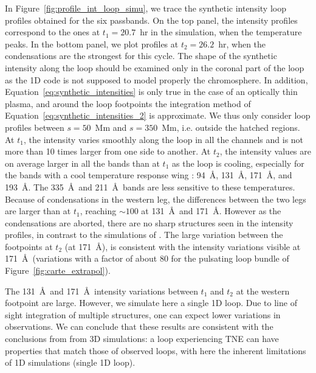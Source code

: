\documentclass[preprint2]{aastex6}
\begin{document}
In Figure~\ref{fig:profile_int_loop_simu}, we trace the synthetic intensity loop profiles obtained for the six passbands. On the top panel, the intensity profiles correspond to the ones at $t_1=20.7$~hr in the simulation, when the temperature peaks. In the bottom panel, we plot profiles at $t_2=26.2$~hr, when the condensations are the strongest for this cycle.
The shape of the synthetic intensity along the loop should be examined only in the coronal part of the loop as the 1D code is not supposed to model properly the chromosphere. In addition, Equation~\ref{eq:synthetic_intensities} is only true in the case of an optically thin plasma, and around the loop footpoints the integration method of Equation~\ref{eq:synthetic_intensities_2} is approximate. We thus only consider loop profiles between $s=50$~Mm and $s=350$~Mm, i.e. outside the hatched regions.
At $t_1$, the intensity varies smoothly along the loop in all the channels and is not more than 10 times larger from one side to another. 
At $t_2$, the intensity values are on average larger in all the bands than at $t_1$ as the loop is cooling, especially for the bands with a cool temperature response wing  : 94~\AA, 131~\AA, 171~\AA, and 193~\AA. The 335~\AA~and 211~\AA~bands are less sensitive to these temperatures. Because of condensations in the western leg, the differences between the two legs are larger than at $t_1$, reaching $\sim 100$ at 131~\AA~and 171~\AA. However as the condensations are aborted, there are no sharp structures seen in the intensity profiles, in contrast to the simulations of \citet{klimchuk2010}. The large variation between the footpoints at $t_2$ (at 171~\AA), is consistent with the intensity variations visible at 171~\AA~(variations with a factor of about 80 for the pulsating loop bundle of Figure~\ref{fig:carte_extrapol}).

The 131~\AA~and 171~\AA~intensity variations between $t_1$ and $t_2$ at the western footpoint are large. However, we simulate here a single 1D loop. Due to line of sight integration of multiple structures, one can expect lower variations in observations.
We can conclude that these results are consistent with the conclusions from \citet{lionello2013} from 3D simulations: a loop experiencing TNE can have properties that match those of observed loops, with here the inherent limitations of 1D simulations (single 1D loop).

	
\end{document}
